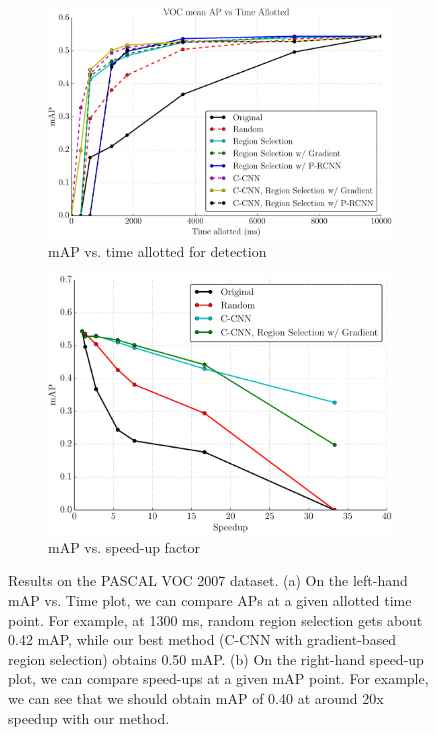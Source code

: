 \begin{figure}[ht]
\centering
\begin{subfigure}[b]{0.52\linewidth}
    \includegraphics[width=\linewidth]{figures/_apvst_final.pdf}
    \caption{mAP vs. time allotted for detection}\label{fig:apvst}
\end{subfigure}\hfill
\begin{subfigure}[b]{0.45\linewidth}
    \includegraphics[width=\linewidth]{figures/_speedup_final_abs.pdf}
    \caption{mAP vs. speed-up factor}\label{fig:speedup}
\end{subfigure}
\caption{
Results on the PASCAL VOC 2007 dataset.
(a) On the left-hand mAP vs. Time plot, we can compare APs at a given allotted time point.
For example, at 1300 ms, random region selection gets about 0.42 mAP, while our best method (C-CNN with gradient-based region selection) obtains 0.50 mAP.
(b) On the right-hand speed-up plot, we can compare speed-ups at a given mAP point.
For example, we can see that we should obtain mAP of 0.40 at around 20x speedup with our method.
}\label{fig:voc2007_results}
\end{figure}

